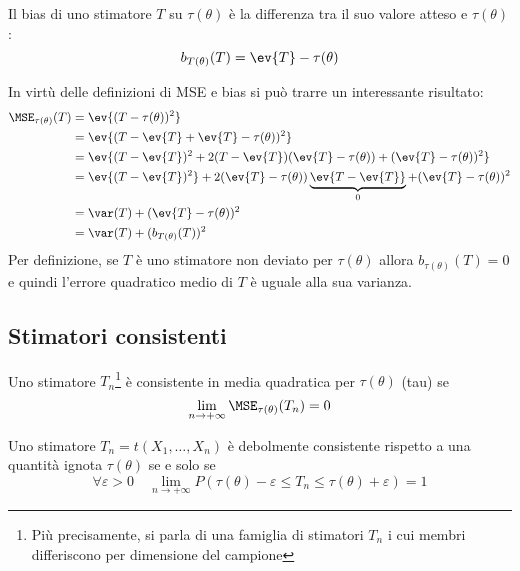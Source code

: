 \begin{defin}
	Il bias di uno stimatore $T$ su $\tau(\theta)$ è la differenza tra il suo valore atteso e $\tau(\theta)$:
	\begin{equation*}
		b_{T(\theta)}(T) = \ev{T} - \tau(\theta)
	\end{equation*}
\end{defin}

In virtù delle definizioni di MSE e bias si può trarre un interessante risultato:
\begin{align*}
	\MSE_{\tau(\theta)}(T) & = \ev{(T-\tau(\theta))^2}                                                                            \\
	                       & = \ev{(T-\ev{T}+\ev{T}-\tau(\theta))^2}                                                              \\
	                       & = \ev{(T-\ev{T})^2+2(T-\ev{T})(\ev{T}-\tau(\theta))+(\ev{T}-\tau(\theta))^2}                         \\
	                       & = \ev{(T-\ev{T})^2} + 2(\ev{T}-\tau(\theta))\underbrace{\ev{T-\ev{T}}}_{0} + (\ev{T}-\tau(\theta))^2 \\
	                       & = \var(T) + (\ev{T}-\tau(\theta))^2                                                                  \\
	                       & = \var(T) + (b_{T(\theta)}(T))^2
\end{align*}
Per definizione, se $T$ è uno stimatore non deviato per $\tau(\theta)$ allora $b_{\tau(\theta)}(T)=0$ e quindi l'errore quadratico medio di $T$ è uguale alla sua varianza.


\subsection{Stimatori consistenti}
\begin{defin}
	Uno stimatore $T_n$\footnote{Più precisamente, si parla di una famiglia di stimatori $T_n$ i cui membri differiscono per dimensione del campione} è consistente in media quadratica per $\tau(\theta)$ (tau) se
	\begin{equation*}
		\lim_{n\to+\infty} \MSE_{\tau(\theta)}(T_n) = 0
	\end{equation*}
\end{defin}

\begin{defin}
	Uno stimatore $T_n=t(X_1,\dots,X_n)$ è debolmente consistente rispetto a una quantità ignota $\tau(\theta)$ se e solo se
	\begin{equation*}
		\forall\varepsilon>0 \quad \lim_{n\to+\infty} P(\tau(\theta)-\varepsilon \leq T_n \leq \tau(\theta)+\varepsilon) = 1
	\end{equation*}
\end{defin}

